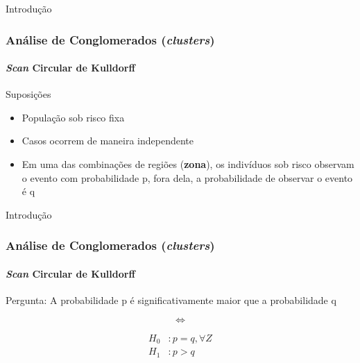 \documentclass[aspectratio=169]{beamer}
\begin{document}
\begin{frame}{Introdução}
\frametitle{Análise de Conglomerados (\textit{clusters})}
\framesubtitle{\textit{Scan} Circular de Kulldorff}

\fboxsep=0pt
\noindent
\begin{minipage}[t]{0.48\linewidth}
Suposições
\begin{itemize}
\item População sob risco fixa
\item Casos ocorrem de maneira independente 
\item Em uma das combinações de regiões (\textbf{zona}), os indivíduos sob risco observam o evento com probabilidade p, fora dela, a probabilidade de observar o evento é q
\end{itemize}

\end{minipage}
\hfill%


\end{frame}

\begin{frame}{Introdução}
\frametitle{Análise de Conglomerados (\textit{clusters})}
\framesubtitle{\textit{Scan} Circular de Kulldorff}

Pergunta: A probabilidade p é significativamente maior que a probabilidade q

$$\iff$$

\begin{align*}
   H_0 & : p = q, \forall Z
   \\
   H_1 & : p > q
\end{align*}

\end{frame}
\end{document}
